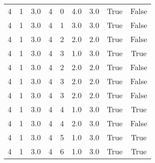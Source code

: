 \documentclass[a4paper,12pt]{article}
\begin{document}
\begin{center}
\begin{tabular}{ c c c | c c c | c | c | c}
        4 & 1 & 3.0 & 4 & 0 & 4.0 & 3.0 & True & False    \\
        4 & 1 & 3.0 & 4 & 1 & 3.0 & 3.0 & True & False    \\
        4 & 1 & 3.0 & 4 & 2 & 2.0 & 2.0 & True & False    \\
        4 & 1 & 3.0 & 4 & 3 & 1.0 & 3.0 & True & True     \\
        4 & 1 & 3.0 & 4 & 2 & 2.0 & 2.0 & True & False    \\
        4 & 1 & 3.0 & 4 & 3 & 2.0 & 2.0 & True & False    \\
        4 & 1 & 3.0 & 4 & 3 & 2.0 & 2.0 & True & False    \\
        4 & 1 & 3.0 & 4 & 4 & 1.0 & 3.0 & True & True     \\
        4 & 1 & 3.0 & 4 & 4 & 2.0 & 3.0 & True & False    \\
        4 & 1 & 3.0 & 4 & 5 & 1.0 & 3.0 & True & True     \\
        4 & 1 & 3.0 & 4 & 6 & 1.0 & 3.0 & True & True     \\
    \end{tabular}
\end{center}
\end{document}

